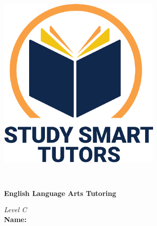 \documentclass[12pt]{article}
\title{}
\date{}
\begin{document}
\thispagestyle{empty}

\vspace*{\fill}

\vspace*{3cm}

\begin{center}

    \includegraphics[width=0.6\textwidth]{SST_Color_Logo.png} %
    
    \vspace{1cm} %
    
    \Huge \textbf{} \\
    \vspace{0.3cm}
    
    \Huge \textbf{English Language Arts  Tutoring}\\ [0.3cm]
 \vspace{1.5cm}
    
    \LARGE \textit{Level C}\\[1cm] 


    \LARGE \textbf{Name:} \underline{\hspace{8cm}}
    
    
    \vspace{0.5cm}
    
    \vspace{1cm}
   
    
    \vfill %
    
\end{center}
\end{document}
